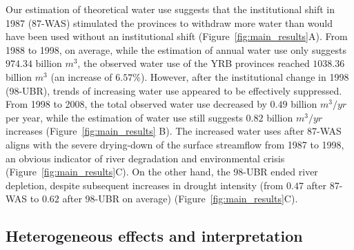 \documentclass[default, sn-standardnature]{sn-jnl} %
\providecommand{\DIFaddend}{} %
\providecommand{\DIFdelbegin}{} %
\providecommand{\DIFaddbeginFL}{} %
\providecommand{\DIFdelendFL}{} %
\newcommand{\DIFscaledelfig}{0.5}
\newlength{\DIFdelgraphicswidth} %
\newlength{\DIFdelgraphicsheight} %
\newcommand{\DIFaddincludegraphics}[2][]{{\color{blue}\fbox{\DIFOincludegraphics[#1]{#2}}}} %
\newcommand{\DIFdelincludegraphics}[2][]{%
\sbox{\DIFdelgraphicsbox}{\DIFOincludegraphics[#1]{#2}}%
\settoboxwidth{\DIFdelgraphicswidth}{\DIFdelgraphicsbox} %
\settoboxtotalheight{\DIFdelgraphicsheight}{\DIFdelgraphicsbox} %
\scalebox{\DIFscaledelfig}{%
\parbox[b]{\DIFdelgraphicswidth}{\usebox{\DIFdelgraphicsbox}\\[-\baselineskip] \rule{\DIFdelgraphicswidth}{0em}}\llap{\resizebox{\DIFdelgraphicswidth}{\DIFdelgraphicsheight}{%
\setlength{\unitlength}{\DIFdelgraphicswidth}%
\begin{picture}(1,1)%
\thicklines\linethickness{2pt} %
{\color[rgb]{1,0,0}\put(0,0){\framebox(1,1){}}}%
{\color[rgb]{1,0,0}\put(0,0){\line( 1,1){1}}}%
{\color[rgb]{1,0,0}\put(0,1){\line(1,-1){1}}}%
\end{picture}%
}\hspace*{3pt}}} %
} %
\DeclareRobustCommand{\DIFaddend}{\DIFOaddend \let\includegraphics\DIFOincludegraphics} %
\DeclareRobustCommand{\DIFdelbegin}{\DIFOdelbegin \let\includegraphics\DIFdelincludegraphics} %
\DeclareRobustCommand{\DIFaddbeginFL}{\DIFOaddbeginFL \let\includegraphics\DIFaddincludegraphics} %
\DeclareRobustCommand{\DIFdelendFL}{\DIFOaddendFL \let\includegraphics\DIFOincludegraphics} %
\begin{document}
\DIFaddend \label{result-1-p2}
Our estimation of theoretical water use suggests that the institutional shift in 1987 (87-WAS) stimulated the provinces to withdraw more water than would have been used without an institutional shift (Figure~\ref{fig:main_results}A).
From 1988 to 1998, on average, while the estimation of annual water use only suggests $974.34$ billion $m^3$, the observed water use of the YRB provinces reached $1038.36$ billion $m^3$ (an increase of $6.57\%$).
However, after the institutional change in 1998 (98-UBR), trends of increasing water use appeared to be effectively suppressed. From 1998 to 2008, the total observed water use decreased by $0.49$ billion $m^3/yr$ per year, while the estimation of water use still suggests $0.82$ billion $m^3/yr$ increases (Figure~\ref{fig:main_results} B).
The increased water uses after 87-WAS aligns with the severe drying-down of the surface streamflow from 1987 to 1998, an obvious indicator of river degradation and environmental crisis (Figure~\ref{fig:main_results}C).
On the other hand, the 98-UBR ended river depletion, despite subsequent increases in drought intensity (from $0.47$ after 87-WAS to $0.62$ after 98-UBR on average) (Figure~\ref{fig:main_results}C).



\DIFdelbegin %
\DIFdelendFL %
\DIFaddbeginFL \subsection{Heterogeneous effects and interpretation}
\label{result-3}
\end{document}
